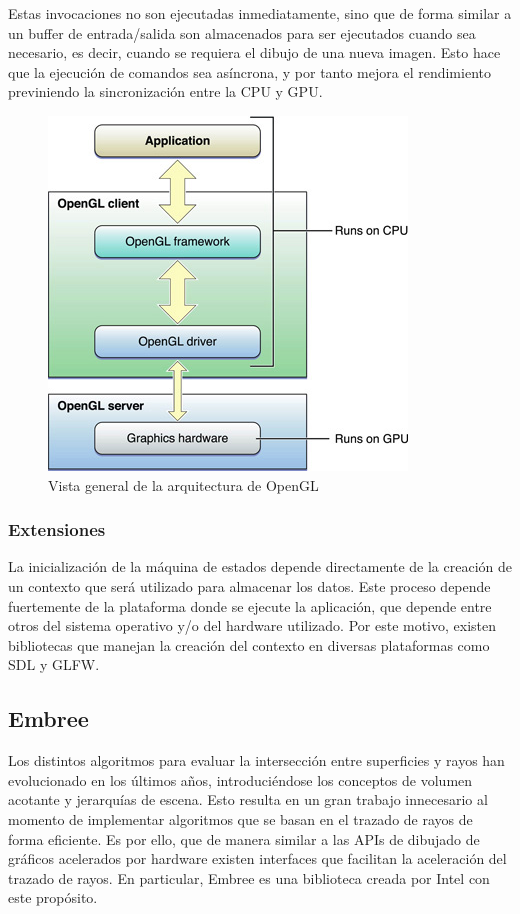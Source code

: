 Estas invocaciones no son ejecutadas inmediatamente, sino que de forma similar a un buffer de entrada/salida son almacenados para ser ejecutados cuando sea necesario, es decir, cuando se requiera el dibujo de una nueva imagen. Esto hace que la ejecución de comandos sea asíncrona, y por tanto mejora el rendimiento previniendo la sincronización entre la CPU y GPU.

\vspace{5mm}
\begin{figure}[h]
	\centering
	\includegraphics[width=.4\linewidth]{assets/cpu_gpu}
	\caption{Vista general de la arquitectura de OpenGL}
	\label{img:gpucpugl}
 \end{figure}

\subsubsection{Extensiones}
La inicialización de la máquina de estados depende directamente de la creación de un contexto que será utilizado para almacenar los datos. Este proceso depende fuertemente de la plataforma donde se ejecute la aplicación, que depende entre otros del sistema operativo y/o del hardware utilizado. Por este motivo, existen bibliotecas que manejan la creación del contexto en diversas plataformas como SDL y GLFW.
	
\subsection{Embree}

Los distintos algoritmos para evaluar la intersección entre superficies y rayos han evolucionado en los últimos años, introduciéndose los conceptos de volumen acotante y jerarquías de escena. Esto resulta en un gran trabajo innecesario al momento de implementar algoritmos que se basan en el trazado de rayos de forma eficiente. Es por ello, que de manera similar a las APIs de dibujado de gráficos acelerados por hardware existen interfaces que facilitan la aceleración del trazado de rayos. En particular, Embree es una biblioteca creada por Intel con este propósito.


